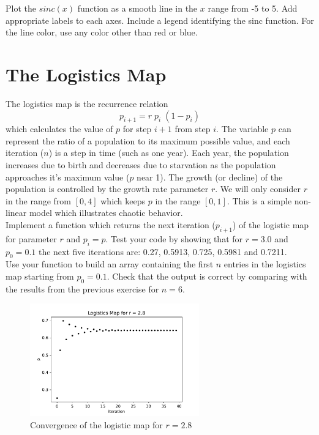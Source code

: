 \plot Plot the $sinc(x)$ function as a smooth line in the $x$ range from -5
to 5.  Add appropriate labels to each axes.  Include a legend identifying the
sinc function.  For the line color, use any color other than red or
blue.

\section{The Logistics Map}
\label{sec:logmap}

The logistics map is the recurrence relation
\begin{displaymath}
p_{i+1} = r \; p_i \; (1 - p_i)
\end{displaymath}
which calculates the value of $p$ for step $i+1$ from step $i$.  The
variable $p$ can represent the ratio of a population to its maximum
possible value, and each iteration ($n$) is a step in time (such as
one year).  Each year, the population increases due to birth and
decreases due to starvation as the population approaches it's maximum
value ($p$ near 1).  The growth (or decline) of the population is
controlled by the growth rate parameter $r$.  We will only consider
$r$ in the range from $[0,4]$ which keeps $p$ in the range $[0,1]$.
This is a simple non-linear model which illustrates chaotic behavior.\\

\plot Implement a function  which returns the
next iteration ($p_{i+1}$) of the logistic map for parameter $r$ and
$p_i = p$.  Test your code by showing that for $r=3.0$ and $p_0=0.1$
the next five iterations are: 0.27, 0.5913, 0.725, 0.5981 and 0.7211.\\

\plot Use your  function to build an array containing the
first $n$ entries in the logistics map starting from $p_0=0.1$.  Check
that the output is correct by comparing with the results from the
previous exercise for $n=6$.\\

\begin{figure}[htbp]
\begin{center}
\includegraphics[width=0.65\textwidth]{figs/plotting/converge.pdf} 
\caption{Convergence of the logistic map for $r=2.8$}
\label{fig:logmapconv}
\end{center}
\end{figure}

